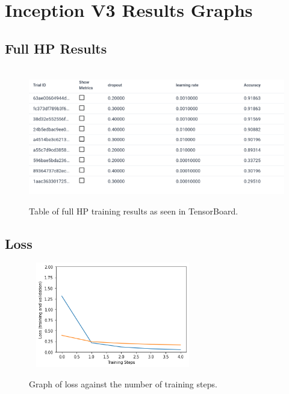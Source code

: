 \documentclass[12pt,a4paper]{report}
\begin{document}
\clearpage

\section{Inception V3 Results Graphs}

\subsection{Full HP Results}

\label{subsec:hp}

\begin{figure}[h]\
    \centering
    \includegraphics[width=\textwidth]{full_hp.png}
    \caption{Table of full HP training results as seen in TensorBoard.}
    \label{fig:hp_full}
\end{figure}

\subsection{Loss}

\label{subsec:loss}

\begin{figure}[h]\
    \centering
    \includegraphics[width=0.6\textwidth]{inception_loss.png}
    \caption{Graph of loss against the number of training steps.}
    \label{fig:incep_loss}
\end{figure}
\end{document}
